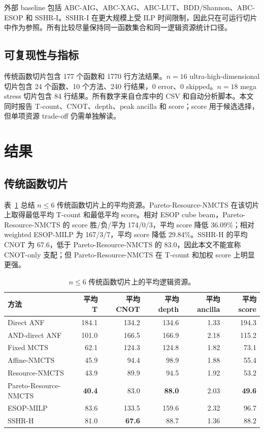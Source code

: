 \documentclass[UTF8,fontset=macnew,11pt]{ctexart}
\newcommand{\method}{Resource-NMCTS}
\newcommand{\pareto}{Pareto-Resource-NMCTS}
\begin{document}
外部 baseline 包括 ABC-AIG、ABC-XAG、ABC-LUT、BDD/Shannon、ABC-ESOP 和 SSHR-I。SSHR-I 在更大规模上受 ILP 时间限制，因此只在可运行切片中作为参照。所有比较尽量保持同一函数集合和同一逻辑资源统计口径。

\subsection{可复现性与指标}

传统函数切片包含 177 个函数和 1770 行方法结果。$n=16$ ultra-high-dimensional 切片包含 24 个函数、10 个方法、240 行结果，0 error、0 skipped。$n=18$ mega stress 切片包含 84 行结果。所有数字来自仓库中的 CSV 和自动分析脚本。本文同时报告 T-count、CNOT、depth、peak ancilla 和 score；score 用于候选选择，但单项资源 trade-off 仍需单独解读。

\section{结果}

\subsection{传统函数切片}

表~\ref{tab:traditional} 总结 $n\leq 6$ 传统函数切片上的平均资源。\pareto{} 在该切片上取得最低平均 T-count 和最低平均 score。相对 ESOP cube beam，\pareto{} 的 score 胜/负/平为 174/0/3，平均 score 降低 36.09\%；相对 weighted ESOP-MILP 为 167/3/7，平均 score 降低 29.84\%。SSHR-H 的平均 CNOT 为 67.6，低于 \pareto{} 的 83.0，因此本文不能宣称 CNOT-only 支配；但 \pareto{} 在 T-count 和加权 score 上明显更强。

\begin{table}[t]
\centering
\small
\caption{$n\leq 6$ 传统函数切片上的平均逻辑资源。}
\label{tab:traditional}
\begin{tabular}{lrrrrr}
\toprule
方法 & 平均 T & 平均 CNOT & 平均 depth & 平均 ancilla & 平均 score \\
\midrule
Direct ANF & 184.1 & 134.2 & 134.6 & 1.33 & 194.3 \\
AND-direct ANF & 101.0 & 166.5 & 166.9 & 2.18 & 115.2 \\
Fixed MCTS & 62.1 & 124.3 & 124.8 & 1.82 & 73.1 \\
Affine-NMCTS & 45.9 & 94.4 & 98.9 & 1.88 & 55.4 \\
\method{} & 43.9 & 89.9 & 94.5 & 1.92 & 53.2 \\
\pareto{} & \textbf{40.4} & 83.0 & \textbf{88.0} & 2.03 & \textbf{49.6} \\
ESOP-MILP & 83.6 & 133.5 & 159.6 & 2.32 & 96.7 \\
SSHR-H & 81.0 & \textbf{67.6} & 88.7 & 1.36 & 88.2 \\
\bottomrule
\end{tabular}
\end{table}
\end{document}
